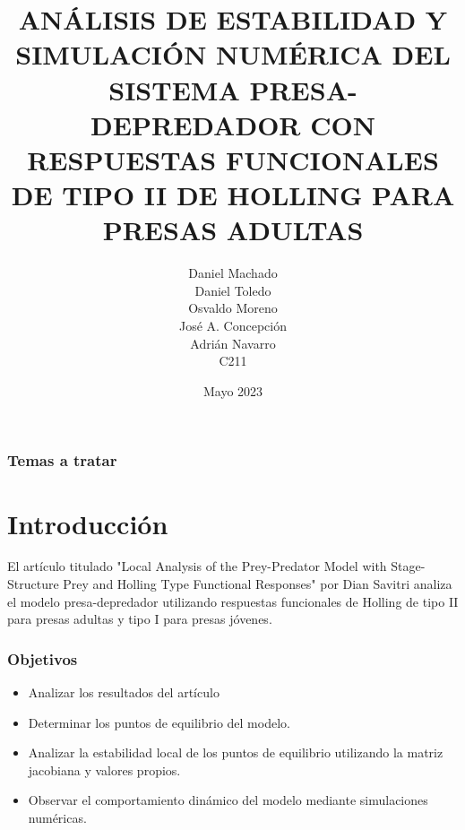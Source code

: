 \documentclass{beamer}
\title[T\'itulo del trabajo]{\tiny{ANÁLISIS DE ESTABILIDAD Y SIMULACIÓN NUMÉRICA DEL SISTEMA PRESA-DEPREDADOR CON RESPUESTAS FUNCIONALES DE TIPO II DE HOLLING PARA PRESAS ADULTAS}}
\author[Machado, Toledo, Moreno, Concepci\'on, Navarro]
		{
			Daniel Machado \\
			Daniel Toledo \\
			Osvaldo Moreno \\
			Jos\'e A. Concepci\'on \\
			Adri\'an Navarro \\
			{\small C211}
		}
\date{Mayo 2023}
\begin{document}

\begin{frame}
	\frametitle{Temas a tratar}
	\tableofcontents
\end{frame}

\section{Introducci\'on}
\begin{frame}
	\begin{minipage}{10cm}
		El artículo titulado "Local Analysis of the Prey-Predator Model with Stage-Structure Prey and Holling
		Type Functional Responses" por Dian Savitri analiza el modelo presa-depredador utilizando respuestas funcionales de Holling de tipo II para presas adultas y tipo I para presas j\'ovenes.
	\end{minipage}
\end{frame}

\begin{frame}
	\frametitle{Objetivos}
	\begin{minipage}{10cm}
		\begin{itemize}
			\item Analizar los resultados del art\'iculo
			\item Determinar los puntos de equilibrio del modelo.
			\item Analizar la estabilidad local de los puntos de equilibrio utilizando la matriz jacobiana y valores propios.
			\item Observar el comportamiento dinámico del modelo mediante
			      simulaciones numéricas.
		\end{itemize}
	\end{minipage}
\end{frame}
\end{document}
